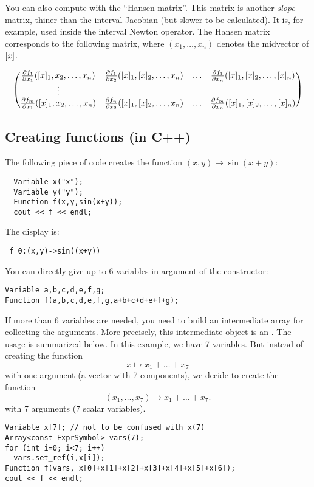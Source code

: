 You can also compute with \ibex the ``Hansen matrix''. This matrix
is another {\it slope} matrix, thiner than the interval Jacobian (but slower to be calculated).
It is, for example, used inside the interval Newton operator.
The Hansen matrix corresponds to the following matrix, where $(x_1,\ldots,x_n)$ denotes
the midvector of $[x]$.

$$\begin{pmatrix}
\frac{\partial f_1}{\partial x_1}([x]_1,x_2,\ldots,x_n) & \frac{\partial f_1}{\partial x_2}([x]_1,[x]_2,\ldots,x_n) & \ldots & \frac{\partial f_1}{\partial x_n}([x]_1,[x]_2,\ldots,[x]_n) \\
\vdots & \\
\frac{\partial f_m}{\partial x_1}([x]_1,x_2,\ldots,x_n) & \frac{\partial f_n}{\partial x_2}([x]_1,[x]_2,\ldots,x_n) & \ldots & \frac{\partial f_m}{\partial x_n}([x]_1,[x]_2,\ldots,[x]_n) \\
\end{pmatrix}$$

\subsection{Creating functions (in C++)}\label{sec:mod-func-cpp}

The following piece of code creates the function
$(x,y)\mapsto \sin(x+y)$:

\begin{lstlisting}	
  Variable x("x");
  Variable y("y");
  Function f(x,y,sin(x+y));
  cout << f << endl;
\end{lstlisting}

The display is:
\begin{lstlisting}
_f_0:(x,y)->sin((x+y))
\end{lstlisting}

You can directly give up to 6 variables in argument of the  constructor:
\begin{lstlisting}
Variable a,b,c,d,e,f,g;
Function f(a,b,c,d,e,f,g,a+b+c+d+e+f+g);
\end{lstlisting}	

If more than 6 variables are needed, you need to build an intermediate array for collecting the arguments.
More precisely, this intermediate object is an . The usage is summarized below. In this
example, we have 7 variables. But instead of creating the function
$$x\mapsto x_1+\ldots+x_7$$
with one argument (a vector with 7 components), we decide to create the function
$$(x_1,\ldots,x_7)\mapsto x_1+\ldots+x_7.$$
with 7 arguments (7 scalar variables).
\begin{lstlisting}
Variable x[7]; // not to be confused with x(7)
Array<const ExprSymbol> vars(7);
for (int i=0; i<7; i++)
  vars.set_ref(i,x[i]);
Function f(vars, x[0]+x[1]+x[2]+x[3]+x[4]+x[5]+x[6]);
cout << f << endl;
\end{lstlisting}	

